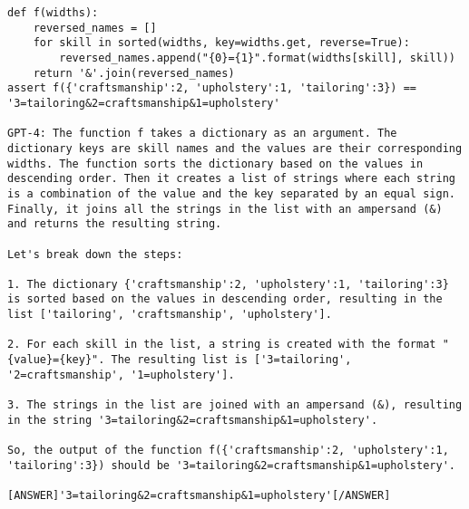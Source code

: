 \begin{lstlisting}
def f(widths):
    reversed_names = []
    for skill in sorted(widths, key=widths.get, reverse=True):
        reversed_names.append("{0}={1}".format(widths[skill], skill))
    return '&'.join(reversed_names)
assert f({'craftsmanship':2, 'upholstery':1, 'tailoring':3}) == '3=tailoring&2=craftsmanship&1=upholstery'

GPT-4: The function f takes a dictionary as an argument. The dictionary keys are skill names and the values are their corresponding widths. The function sorts the dictionary based on the values in descending order. Then it creates a list of strings where each string is a combination of the value and the key separated by an equal sign. Finally, it joins all the strings in the list with an ampersand (&) and returns the resulting string.

Let's break down the steps:

1. The dictionary {'craftsmanship':2, 'upholstery':1, 'tailoring':3} is sorted based on the values in descending order, resulting in the list ['tailoring', 'craftsmanship', 'upholstery'].

2. For each skill in the list, a string is created with the format "{value}={key}". The resulting list is ['3=tailoring', '2=craftsmanship', '1=upholstery'].

3. The strings in the list are joined with an ampersand (&), resulting in the string '3=tailoring&2=craftsmanship&1=upholstery'.

So, the output of the function f({'craftsmanship':2, 'upholstery':1, 'tailoring':3}) should be '3=tailoring&2=craftsmanship&1=upholstery'.

[ANSWER]'3=tailoring&2=craftsmanship&1=upholstery'[/ANSWER]
\end{lstlisting}

